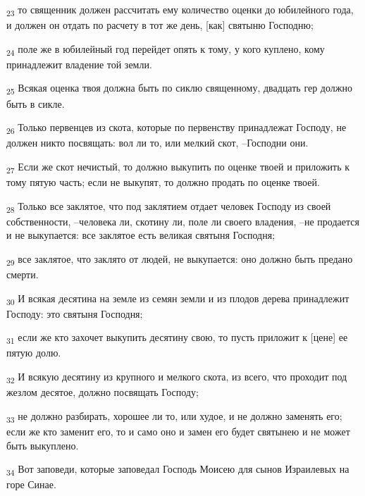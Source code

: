 \begin{tcolorbox}
\textsubscript{23} то священник должен рассчитать ему количество оценки до юбилейного года, и должен он отдать по расчету в тот же день, [как] святыню Господню;
\end{tcolorbox}
\begin{tcolorbox}
\textsubscript{24} поле же в юбилейный год перейдет опять к тому, у кого куплено, кому принадлежит владение той земли.
\end{tcolorbox}
\begin{tcolorbox}
\textsubscript{25} Всякая оценка твоя должна быть по сиклю священному, двадцать гер должно быть в сикле.
\end{tcolorbox}
\begin{tcolorbox}
\textsubscript{26} Только первенцев из скота, которые по первенству принадлежат Господу, не должен никто посвящать: вол ли то, или мелкий скот, --Господни они.
\end{tcolorbox}
\begin{tcolorbox}
\textsubscript{27} Если же скот нечистый, то должно выкупить по оценке твоей и приложить к тому пятую часть; если не выкупят, то должно продать по оценке твоей.
\end{tcolorbox}
\begin{tcolorbox}
\textsubscript{28} Только все заклятое, что под заклятием отдает человек Господу из своей собственности, --человека ли, скотину ли, поле ли своего владения, --не продается и не выкупается: все заклятое есть великая святыня Господня;
\end{tcolorbox}
\begin{tcolorbox}
\textsubscript{29} все заклятое, что заклято от людей, не выкупается: оно должно быть предано смерти.
\end{tcolorbox}
\begin{tcolorbox}
\textsubscript{30} И всякая десятина на земле из семян земли и из плодов дерева принадлежит Господу: это святыня Господня;
\end{tcolorbox}
\begin{tcolorbox}
\textsubscript{31} если же кто захочет выкупить десятину свою, то пусть приложит к [цене] ее пятую долю.
\end{tcolorbox}
\begin{tcolorbox}
\textsubscript{32} И всякую десятину из крупного и мелкого скота, из всего, что проходит под жезлом десятое, должно посвящать Господу;
\end{tcolorbox}
\begin{tcolorbox}
\textsubscript{33} не должно разбирать, хорошее ли то, или худое, и не должно заменять его; если же кто заменит его, то и само оно и замен его будет святынею и не может быть выкуплено.
\end{tcolorbox}
\begin{tcolorbox}
\textsubscript{34} Вот заповеди, которые заповедал Господь Моисею для сынов Израилевых на горе Синае.
\end{tcolorbox}
